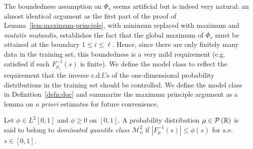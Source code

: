 \documentclass[letterpaper]{article} %
\begin{document}

The boundedness assumption on $\Phi_s$ seems artificial but is indeed very natural: an almost identical argument as the first part of the proof of Lemma~\ref{lem:maximum-principle}, with minimum replaced with maximum and \emph{mutatis mutandis}, establishes the fact that the global maximum of $\Phi_s$ must be attained at the boundary $1\leq i\leq \ell$.  Hence, since there are only finitely many data in the training set, this boundedness is a very mild requirement (e.g. satisfied if each $F_{\mu_i}^{-1} \left( s \right)$ is finite). We define the model class to reflect the requirement that the inverse c.d.f.'s of the one-dimensional probability distributions in the training set should be controlled. We define the model class in Definition~\ref{defn:dqc} and summarize the maximum principle argument as a lemma on \emph{a priori} estimates for future convenience. 

\begin{definition}
\label{defn:dqc}
  Let $\phi\in L^2 \left[ 0,1 \right]$ and $\phi\geq 0$ on $\left[ 0,1 \right]$. A probability distribution $\mu\in\P\left( \mathbb{R} \right)$ is said to belong to \emph{dominated quantile class $\mathcal{M}_{\phi}^2$} if $\left|F_{\mu}^{-1}\left( s \right)\right|\leq \phi \left( s \right)$ for a.e. $s\in \left[0,1\right]$.
\end{definition}
\end{document}
